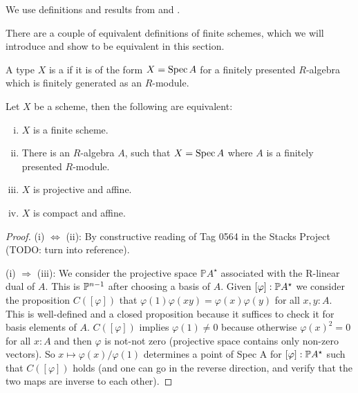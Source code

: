We use definitions and results from \cite{draft} and \cite{proper-draft}.

There are a couple of equivalent definitions of finite schemes, which we will introduce and show to be equivalent in this section.

\begin{definition}
  A type $X$ is a  if it is of the form $X=\operatorname{Spec} A$ for a finitely presented $R$-algebra which is finitely generated as an $R$-module.
\end{definition}

\begin{theorem}
  Let $X$ be a scheme, then the following are equivalent:
  \begin{enumerate}[(i)]
  \item $X$ is a finite scheme.
  \item There is an $R$-algebra $A$, such that $X=\operatorname{Spec} A$ where $A$ is a finitely presented $R$-module.
  \item $X$ is projective and affine.
  \item $X$ is compact and affine.
  \end{enumerate}
\end{theorem}

\begin{proof}
  (i) $\Leftrightarrow$ (ii): By constructive reading of Tag 0564 in the Stacks Project (TODO: turn into reference).
  
  (i) $\Rightarrow$ (iii): We consider the projective space $\mathbb PA^\star$ associated with the R-linear dual of $A$.
  This is $\mathbb{P}^{n-1}$ after choosing a basis of $A$.
  Given $[\varphi] : \mathbb{P} A^\star$ we consider the proposition $C([\varphi])$ that $\varphi(1) \varphi(xy) = \varphi(x) \varphi(y)$ for all $x, y  : A$.
  This is well-defined and a closed proposition because it suffices to check it for basis elements of $A$.
  $C([\varphi])$ implies $\varphi(1) \ne 0$ because otherwise $\varphi(x)^2 = 0$ for all $x : A$ and then $\varphi$ is not-not zero (projective space contains only non-zero vectors).
  So $x \mapsto \varphi(x) / \varphi(1)$ determines a point of Spec A for $[\varphi] : \mathbb{P} A^\star$ such that $C([\varphi])$ holds (and one can go in the reverse direction, and verify that the two maps are inverse to each other).
\end{proof}
